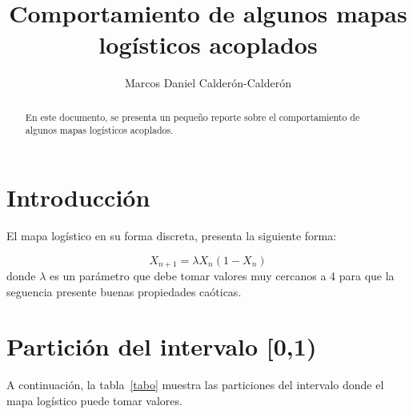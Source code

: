 \documentclass[preprint]{elsarticle}
\begin{document}
\begin{frontmatter}

\title{Comportamiento de algunos mapas logísticos acoplados}


\author[md]{Marcos Daniel Calderón-Calderón}



\address[md]{Center for Research in Mathematics (CIMAT), Guanajuato, México.}


\begin{abstract}
En este documento, se presenta un pequeño reporte sobre el comportamiento de algunos mapas logísticos acoplados.
\end{abstract}



\end{frontmatter}



 
   
 
 


\section*{Introducción}
El mapa logístico en su forma discreta, presenta la siguiente forma:

\begin{equation}
X_{n+1}= \lambda X_{n}(1 - X_{n})
\end{equation}
donde $\lambda$ es un parámetro que debe tomar valores muy cercanos a 4 para que la seguencia presente buenas propiedades caóticas.


\section*{Partición del intervalo [0,1)}
A continuación, la tabla~\ref{tabo} muestra las particiones del intervalo donde el mapa logístico puede tomar valores.
\end{document}
